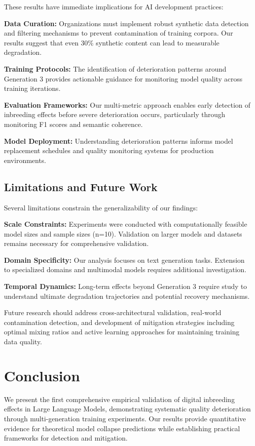 \documentclass{article}
\begin{document}
These results have immediate implications for AI development practices:

\textbf{Data Curation:} Organizations must implement robust synthetic data detection and filtering mechanisms to prevent contamination of training corpora. Our results suggest that even 30\% synthetic content can lead to measurable degradation.

\textbf{Training Protocols:} The identification of deterioration patterns around Generation 3 provides actionable guidance for monitoring model quality across training iterations.

\textbf{Evaluation Frameworks:} Our multi-metric approach enables early detection of inbreeding effects before severe deterioration occurs, particularly through monitoring F1 scores and semantic coherence.

\textbf{Model Deployment:} Understanding deterioration patterns informs model replacement schedules and quality monitoring systems for production environments.

\subsection{Limitations and Future Work}

Several limitations constrain the generalizability of our findings:

\textbf{Scale Constraints:} Experiments were conducted with computationally feasible model sizes and sample sizes (n=10). Validation on larger models and datasets remains necessary for comprehensive validation.

\textbf{Domain Specificity:} Our analysis focuses on text generation tasks. Extension to specialized domains and multimodal models requires additional investigation.

\textbf{Temporal Dynamics:} Long-term effects beyond Generation 3 require study to understand ultimate degradation trajectories and potential recovery mechanisms.

Future research should address cross-architectural validation, real-world contamination detection, and development of mitigation strategies including optimal mixing ratios and active learning approaches for maintaining training data quality.

\section{Conclusion}

We present the first comprehensive empirical validation of digital inbreeding effects in Large Language Models, demonstrating systematic quality deterioration through multi-generation training experiments. Our results provide quantitative evidence for theoretical model collapse predictions while establishing practical frameworks for detection and mitigation.
\end{document}
